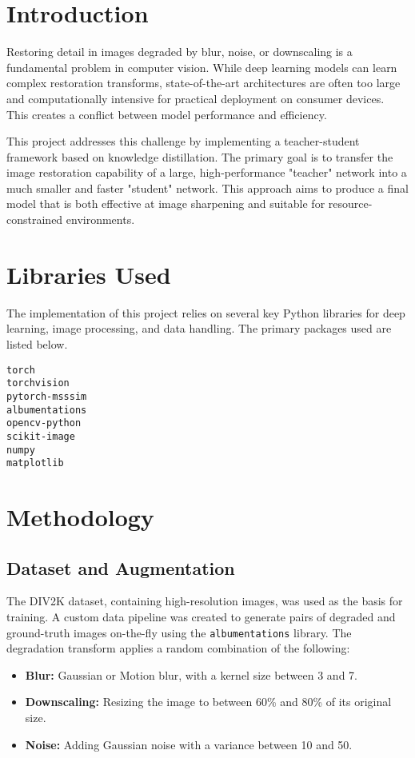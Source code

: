 \documentclass[12pt,a4paper]{article}
\begin{document}
\section{Introduction}
Restoring detail in images degraded by blur, noise, or downscaling is a fundamental problem in computer vision. While deep learning models can learn complex restoration transforms, state-of-the-art architectures are often too large and computationally intensive for practical deployment on consumer devices. This creates a conflict between model performance and efficiency.

This project addresses this challenge by implementing a teacher-student framework based on knowledge distillation. The primary goal is to transfer the image restoration capability of a large, high-performance "teacher" network into a much smaller and faster "student" network. This approach aims to produce a final model that is both effective at image sharpening and suitable for resource-constrained environments.

\section{Libraries Used}
The implementation of this project relies on several key Python libraries for deep learning, image processing, and data handling. The primary packages used are listed below.
\begin{verbatim}
torch
torchvision
pytorch-msssim
albumentations
opencv-python
scikit-image
numpy
matplotlib
\end{verbatim}

\newpage
\section{Methodology}

\subsection{Dataset and Augmentation}
The DIV2K dataset, containing high-resolution images, was used as the basis for training. A custom data pipeline was created to generate pairs of degraded and ground-truth images on-the-fly using the \texttt{albumentations} library. The degradation transform applies a random combination of the following:
\begin{itemize}
    \item \textbf{Blur:} Gaussian or Motion blur, with a kernel size between 3 and 7.
    \item \textbf{Downscaling:} Resizing the image to between 60\% and 80\% of its original size.
    \item \textbf{Noise:} Adding Gaussian noise with a variance between 10 and 50.
\end{itemize}
\end{document}
